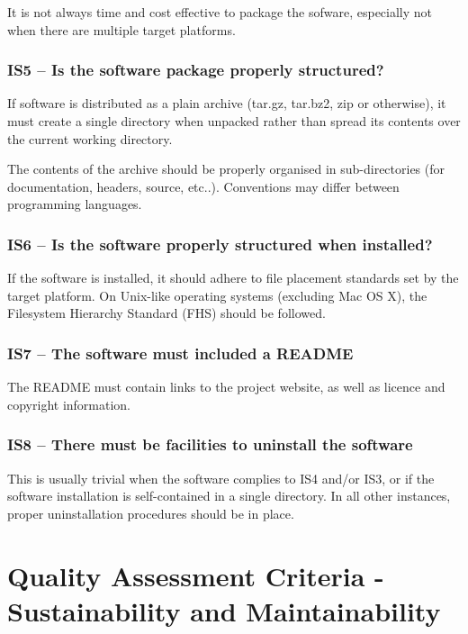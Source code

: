 \documentclass[a4paper,11pt]{article}
\begin{document}
It is not always time and cost effective to package the sofware, especially not
when there are multiple target platforms. 

\subsubsection{IS5 -- Is the software package properly structured?}

If software is distributed as a plain archive (tar.gz, tar.bz2, zip or otherwise),
it must create a single directory when unpacked rather than spread its contents
over the current working directory.

The contents of the archive should be properly organised in sub-directories
(for documentation, headers, source, etc..). Conventions may differ between
programming languages.

\subsubsection{IS6 -- Is the software properly structured when installed?}

If the software is installed, it should adhere to file placement standards set
by the target platform. On Unix-like operating systems (excluding Mac OS X), the Filesystem
Hierarchy Standard (FHS) should be followed.

\subsubsection{IS7 -- The software must included a README}

The README must contain links to the project website, as well as licence and copyright
information.

\subsubsection{IS8 -- There must be facilities to uninstall the software}

This is usually trivial when the software complies to IS4 and/or IS3, or if the
software installation is self-contained in a single directory. In all other
instances, proper uninstallation procedures should be in place.


\section{Quality Assessment Criteria - Sustainability and Maintainability}
\end{document}
